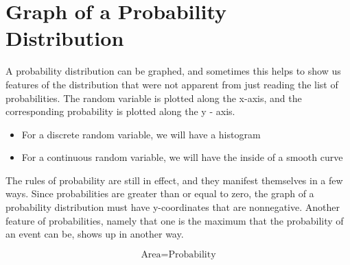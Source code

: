 \documentclass[a4paper,12pt]{article}
\begin{document}

\section{Graph of a Probability Distribution}

A probability distribution can be graphed, and sometimes this helps to show us features of the distribution that were not apparent from just reading the list of probabilities. The random variable is plotted along the x-axis, and the corresponding probability is plotted along the y - axis.

\begin{itemize}
\item For a discrete random variable, we will have a histogram
\item For a continuous random variable, we will have the inside of a smooth curve
\end{itemize}

The rules of probability are still in effect, and they manifest themselves in a few ways. Since probabilities are greater than or equal to zero, the graph of a probability distribution must have y-coordinates that are nonnegative. Another feature of probabilities, namely that one is the maximum that the probability of an event can be, shows up in another way.

\[ \mbox{Area} = \mbox{Probability} \]
\end{document}
